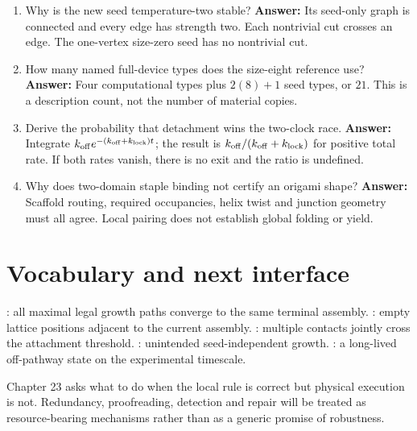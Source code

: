 \begin{enumerate}
\textbf{Rubric:} Declare sequences and conditions; include seeded/no-seed and
mismatch controls; measure time and defect distributions; vary concentration or
temperature; define image classification in advance; compare with a reversible
kinetic model; report uncertainty and failed assemblies.
\item Why is the new seed temperature-two stable?
\textbf{Answer:} Its seed-only graph is connected and every edge has strength
two. Each nontrivial cut crosses an edge. The one-vertex size-zero seed has no
nontrivial cut.
\item How many named full-device types does the size-eight reference use?
\textbf{Answer:} Four computational types plus $2(8)+1$ seed types, or $21$.
This is a description count, not the number of material copies.
\item Derive the probability that detachment wins the two-clock race.
\textbf{Answer:} Integrate $k_{\rm off}e^{-(k_{\rm off}+k_{\rm lock})t}$;
the result is $k_{\rm off}/(k_{\rm off}+k_{\rm lock})$ for positive total
rate. If both rates vanish, there is no exit and the ratio is undefined.
\item Why does two-domain staple binding not certify an origami shape?
\textbf{Answer:} Scaffold routing, required occupancies, helix twist and junction
geometry must all agree. Local pairing does not establish global folding or yield.
\end{enumerate}

\section{Vocabulary and next interface}

: all maximal legal growth paths converge to the same
terminal assembly. : empty lattice positions adjacent to the
current assembly. : multiple contacts jointly cross
the attachment threshold. : unintended seed-independent
growth. : a long-lived off-pathway state on the experimental
timescale.

Chapter 23 asks what to do when the local rule is correct but physical execution
is not. Redundancy, proofreading, detection and repair will be treated as
resource-bearing mechanisms rather than as a generic promise of robustness.
